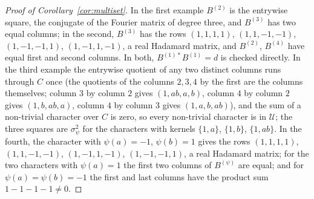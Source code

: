 \begin{proof}[Proof of Corollary~\ref{cor:multiset}]
In the first example $B^{(2)}$ is the entrywise square, the conjugate of the Fourier matrix of degree three, and $B^{(3)}$ has two equal columns; in the second, $B^{(3)}$ has the rows $(1,1,1,1)$, $(1,1,-1,-1)$, $(1,-1,-1,1)$, $(1,-1,1,-1)$, a real Hadamard matrix, and $B^{(2)}$, $B^{(4)}$ have equal first and second columns. In both, $B^{(1)*}B^{(1)}=d$ is checked directly. In the third example the entrywise quotient of any two distinct columns runs through $C$ once (the quotients of the columns $2,3,4$ by the first are the columns themselves; column $3$ by column $2$ gives $(1,ab,a,b)$, column $4$ by column $2$ gives $(1,b,ab,a)$, column $4$ by column $3$ gives $(1,a,b,ab)$), and the sum of a non-trivial character over $C$ is zero, so every non-trivial character is in $\mathcal{U}$; the three squares are $\sigma_\psi^2$ for the characters with kernels $\{1,a\}$, $\{1,b\}$, $\{1,ab\}$. In the fourth, the character with $\psi(a)=-1$, $\psi(b)=1$ gives the rows $(1,1,1,1)$, $(1,1,-1,-1)$, $(1,-1,1,-1)$, $(1,-1,-1,1)$, a real Hadamard matrix; for the two characters with $\psi(a)=1$ the first two columns of $B^{(\psi)}$ are equal; and for $\psi(a)=\psi(b)=-1$ the first and last columns have the product sum $1-1-1-1\ne0$.
\end{proof}

